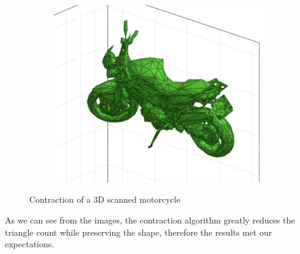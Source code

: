 \documentclass{ijclclp}
\begin{document}
\begin{itemize}
\begin{figure}[h]
\begin{subfigure}{.4\textwidth}
  \centering
  \includegraphics[width=\linewidth]{motorcycle5.png}
\end{subfigure}

\caption{Contraction of a 3D scanned motorcycle}
\end{figure}
\end{itemize}

As we can see from the images, the contraction algorithm greatly reduces the triangle count while preserving the shape, therefore the results met our expectations.
\nocite{*}

\end{document}
